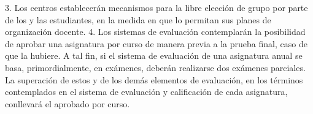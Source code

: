 \documentclass{article}
\begin{document}
\begin{itemize}
\begin{itemize}
\begin{scriptsize}
                  3. Los centros establecerán mecanismos para la libre elección de grupo por parte de los y las estudiantes, en la medida en que lo permitan sus planes de organización docente.
                  4. Los sistemas de evaluación contemplarán la posibilidad de aprobar una asignatura por curso de manera previa a la prueba final, caso de que la hubiere. A tal fin, si el sistema de evaluación de una asignatura anual se basa, primordialmente, en exámenes, deberán realizarse dos exámenes parciales. La superación de estos y de los demás elementos de evaluación, en los términos contemplados en el sistema de evaluación y calificación de cada asignatura, conllevará el aprobado por curso.
                \end{scriptsize}
        \end{itemize}


\end{itemize}
\end{document}
